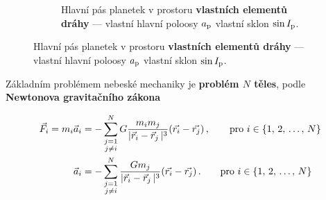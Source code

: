 \documentclass{beamer}
\newlength{\sep}
\newlength{\vyska}
\newlength{\vyskaA}
\newlength{\side}
\begin{document}
\begin{frame}
\begin{columns}[t]
\begin{column}{\side}
\begin{tcolorbox}[title=Úvod\phantom{Úy},height=0.335\vyskaA,parbox=false]
\begin{figure}[!htb]
\begin{subfigure}[t]{0.55\textwidth}
			\caption{Hlavní pás planetek v prostoru \textbf{vlastních elementů dráhy} --- vlastní hlavní poloosy $a_{\rm p}$ vlastní sklon $\sin I_{\rm p}$.} \label{fig:belt}
			\end{subfigure}
		\end{figure}
	\end{tcolorbox}

\vspace{\sep}

	\begin{tcolorbox}[title=Metody\phantom{Úy},height=0.665\vyskaA]

		Základním problémem nebeské mechaniky je \textbf{problém $N$ těles}, podle \textbf{Newtonova gravitačního zákona}

		{\footnotesize
		\begin{align*} 
			\vec{F}_i = m_i\vec{a}_i &= -\sum_{\substack{j=1 \\ j\neq i}}^N G\frac{m_im_j}{\lvert \vec{r}_i-\vec{r}_j \,\rvert^3}(\vec{r_i}-\vec{r_j})\,, \qquad{\rm pro}\ i\in\{1,\,2,\,\dots,\,N\} \\
			\vec{a}_i &= -\sum_{\substack{j=1 \\ j\neq i}}^N \frac{Gm_j}{\lvert \vec{r}_i-\vec{r}_j \,\rvert^3}(\vec{r_i}-\vec{r_j})\,. \qquad{\rm pro}\ i\in\{1,\,2,\,\dots,\,N\} 
		\end{align*}}


\end{tcolorbox}
\end{column}
\end{columns}
\end{frame}
\end{document}

